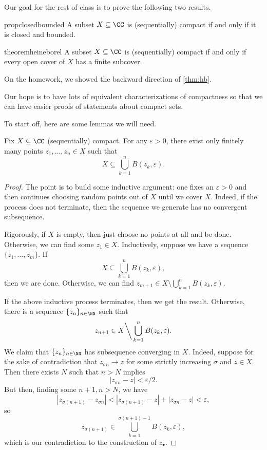 Our goal for the rest of class is to prove the following two results.
\begin{restatable}{prop}{closedbounded}
	A subset $X\subseteq\CC$ is (sequentially) compact if and only if it is closed and bounded.
\end{restatable}
\begin{restatable}{theorem}{heineborel} \label{thm:hb}
	A subset $X\subseteq\CC$ is (sequentially) compact if and only if every open cover of $X$ has a finite subcover.
\end{restatable}
On the homework, we showed the backward direction of \autoref{thm:hb}.
\begin{remark}
	Our hope is to have lots of equivalent characterizations of compactness so that we can have easier proofs of statements about compact sets.
\end{remark}
To start off, here are some lemmas we will need.
\begin{lemma}
	Fix $X\subseteq\CC$ (sequentially) compact. For any $\varepsilon>0$, there exist only finitely many points $z_1,\ldots,z_n\in X$ such that
	\[X\subseteq\bigcup_{k=1}^nB(z_k,\varepsilon).\]
\end{lemma}
\begin{proof}
	The point is to build some inductive argument: one fixes an $\varepsilon>0$ and then continues choosing random points out of $X$ until we cover $X$. Indeed, if the process does not terminate, then the sequence we generate has no convergent subsequence.

	Rigorously, if $X$ is empty, then just choose no points at all and be done. Otherwise, we can find some $z_1\in X$. Inductively, suppose we have a sequence $\{z_1,\ldots,z_m\}$. If
	\[X\subseteq\bigcup_{k=1}^nB(z_k,\varepsilon),\]
	then we are done. Otherwise, we can find $z_{m+1}\in X\setminus\bigcup_{k=1}^nB(z_k,\varepsilon)$.

	If the above inductive process terminates, then we get the result. Otherwise, there is a sequence $\{z_n\}_{n\in\NN}$ such that
	\[z_{n+1}\in X{\mathbin\bigg\backslash}\bigcup_{k=1}^nB(z_k,\varepsilon).\]
	We claim that $\{z_n\}_{n\in\NN}$ has subsequence converging in $X$. Indeed, suppose for the sake of contradiction that $z_{\sigma n}\to z$ for some strictly increasing $\sigma$ and $z\in X$. Then there exists $N$ such that $n>N$ implies
	\[|z_{\sigma n}-z|<\varepsilon/2.\]
	But then, finding some $n+1,n>N$, we have
	\[|z_{\sigma(n+1)}-z_{\sigma n}|<|z_{\sigma(n+1)}-z|+|z_{\sigma n}-z|<\varepsilon,\]
	so
	\[z_{\sigma(n+1)}\in\bigcup_{k=1}^{\sigma(n+1)-1}B(z_k,\varepsilon),\]
	which is our contradiction to the construction of $z_\bullet$.
\end{proof}
